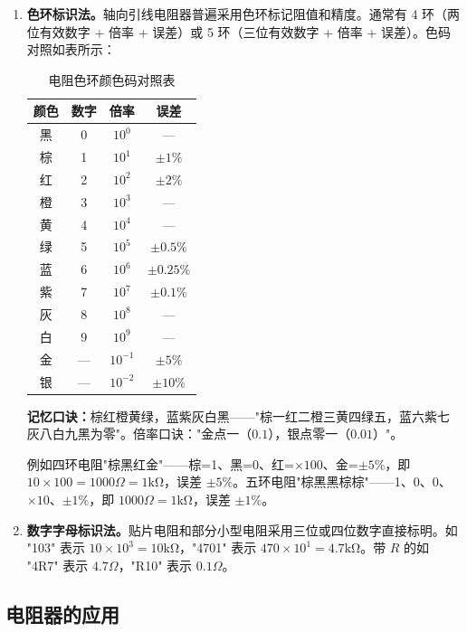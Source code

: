 \documentclass[12pt,UTF8]{ctexbook}
\begin{document}
\begin{enumerate}
\item \textbf{色环标识法。}轴向引线电阻器普遍采用色环标记阻值和精度。通常有 4 环（两位有效数字 + 倍率 + 误差）或 5 环（三位有效数字 + 倍率 + 误差）。色码对照如表所示：

\begin{table}[htbp]
\centering
\caption{电阻色环颜色码对照表}
\begin{tabular}{c|c|c|c}
\hline
颜色 & 数字 & 倍率 & 误差 \\
\hline
黑 & 0 & $10^0$ & — \\
棕 & 1 & $10^1$ & $\pm1\%$ \\
红 & 2 & $10^2$ & $\pm2\%$ \\
橙 & 3 & $10^3$ & — \\
黄 & 4 & $10^4$ & — \\
绿 & 5 & $10^5$ & $\pm0.5\%$ \\
蓝 & 6 & $10^6$ & $\pm0.25\%$ \\
紫 & 7 & $10^7$ & $\pm0.1\%$ \\
灰 & 8 & $10^8$ & — \\
白 & 9 & $10^9$ & — \\
金 & — & $10^{-1}$ & $\pm5\%$ \\
银 & — & $10^{-2}$ & $\pm10\%$ \\
\hline
\end{tabular}
\end{table}

\textbf{记忆口诀：}棕红橙黄绿，蓝紫灰白黑——"棕一红二橙三黄四绿五，蓝六紫七灰八白九黑为零"。倍率口诀："金点一（$0.1$），银点零一（$0.01$）"。

例如四环电阻"棕黑红金"——棕=1、黑=0、红=$\times100$、金=$\pm5\%$，即 $10 \times 100 = 1000\Omega = 1\mathrm{k\Omega}$，误差 $\pm5\%$。五环电阻"棕黑黑棕棕"——1、0、0、$\times10$、$\pm1\%$，即 $1000\Omega = 1\mathrm{k\Omega}$，误差 $\pm1\%$。

\item \textbf{数字字母标识法。}贴片电阻和部分小型电阻采用三位或四位数字直接标明。如 "103" 表示 $10 \times 10^3 = 10\mathrm{k\Omega}$，"4701" 表示 $470 \times 10^1 = 4.7\mathrm{k\Omega}$。带 $R$ 的如 "4R7" 表示 $4.7\Omega$，"R10" 表示 $0.1\Omega$。
\end{enumerate}

\subsection{电阻器的应用}
\end{document}
